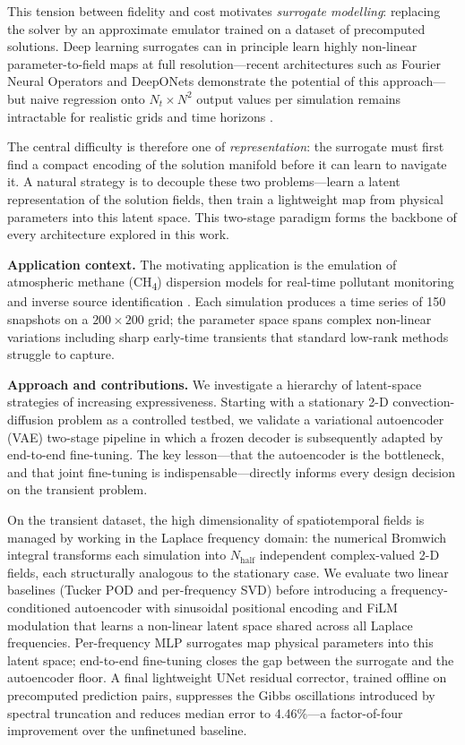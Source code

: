 \documentclass[a4paper]{article}
\begin{document}
This tension between fidelity and cost motivates \emph{surrogate modelling}: replacing the solver by an approximate emulator trained on a dataset of precomputed solutions. Deep learning surrogates can in principle learn highly non-linear parameter-to-field maps at full resolution—recent architectures such as Fourier Neural Operators \cite{li2021fno} and DeepONets \cite{lu2021deeponet} demonstrate the potential of this approach—but naive regression onto $N_t \times N^2$ output values per simulation remains intractable for realistic grids and time horizons \cite{karniadakis2021,quarteroni2025}.

The central difficulty is therefore one of \emph{representation}: the surrogate must first find a compact encoding of the solution manifold before it can learn to navigate it. A natural strategy is to decouple these two problems—learn a latent representation of the solution fields, then train a lightweight map from physical parameters into this latent space. This two-stage paradigm forms the backbone of every architecture explored in this work.

\textbf{Application context.}
The motivating application is the emulation of atmospheric methane (CH\textsubscript{4}) dispersion models for real-time pollutant monitoring and inverse source identification \cite{fan2025,guo2022}. Each simulation produces a time series of 150 snapshots on a $200 \times 200$ grid; the parameter space spans complex non-linear variations including sharp early-time transients that standard low-rank methods struggle to capture.

\textbf{Approach and contributions.}
We investigate a hierarchy of latent-space strategies of increasing expressiveness. Starting with a stationary 2-D convection-diffusion problem as a controlled testbed, we validate a variational autoencoder (VAE) two-stage pipeline in which a frozen decoder is subsequently adapted by end-to-end fine-tuning. The key lesson—that the autoencoder is the bottleneck, and that joint fine-tuning is indispensable—directly informs every design decision on the transient problem.

On the transient dataset, the high dimensionality of spatiotemporal fields is managed by working in the Laplace frequency domain: the numerical Bromwich integral transforms each simulation into $N_{\mathrm{half}}$ independent complex-valued 2-D fields, each structurally analogous to the stationary case. We evaluate two linear baselines (Tucker POD and per-frequency SVD) before introducing a frequency-conditioned autoencoder with sinusoidal positional encoding and FiLM modulation that learns a non-linear latent space shared across all Laplace frequencies. Per-frequency MLP surrogates map physical parameters into this latent space; end-to-end fine-tuning closes the gap between the surrogate and the autoencoder floor. A final lightweight UNet residual corrector, trained offline on precomputed prediction pairs, suppresses the Gibbs oscillations introduced by spectral truncation and reduces median error to 4.46\%—a factor-of-four improvement over the unfinetuned baseline.
\end{document}
